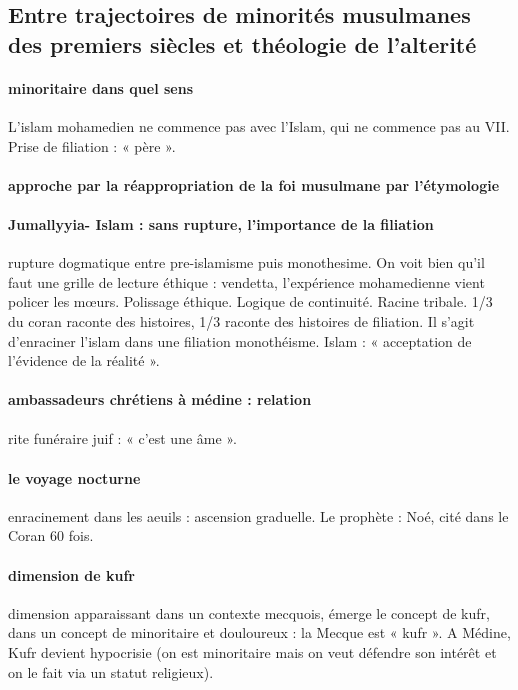 \subsection{Entre trajectoires de minorités musulmanes des premiers siècles et théologie de l’alterité}

\paragraph{minoritaire dans quel sens} L’islam mohamedien ne commence pas avec l’Islam, qui ne commence pas au VII. Prise de filiation : « père ». 

\paragraph{approche par la réappropriation de la foi musulmane par l’étymologie}
\paragraph{Jumallyyia- Islam : sans rupture, l’importance de la filiation} rupture dogmatique entre pre-islamisme puis monothesime. On voit bien qu’il faut une grille de lecture éthique : vendetta, l’expérience mohamedienne vient policer les mœurs. Polissage éthique. Logique de continuité. Racine tribale. 1/3 du coran raconte des histoires, 1/3 raconte des histoires de filiation. Il s’agit d’enraciner l’islam dans une filiation monothéisme. 
Islam : « acceptation de l’évidence de la réalité ». 

\paragraph{ambassadeurs chrétiens à médine : relation}
\paragraph{} rite funéraire juif : « c’est une âme ». 
\paragraph{le voyage nocturne} enracinement dans les aeuils : ascension graduelle.  Le prophète : Noé, cité dans le Coran 60 fois. 

\paragraph{dimension de kufr} dimension apparaissant dans un contexte mecquois, émerge le concept de kufr, dans un concept de minoritaire et douloureux : la Mecque est « kufr ».
A Médine, Kufr devient hypocrisie (on est minoritaire mais on veut défendre son intérêt et on le fait via un statut religieux).
